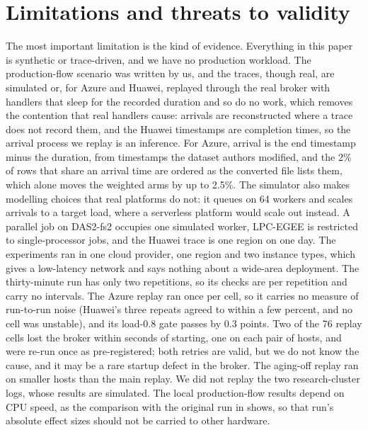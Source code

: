 \section{Limitations and threats to validity}\label{sec:limits}

The most important limitation is the kind of evidence. Everything in this paper is synthetic or trace-driven, and we
have no production workload. The production-flow scenario was written by us, and the traces, though real, are
simulated or, for Azure and Huawei, replayed through the real broker with handlers that sleep for the recorded duration and so do no work, which removes the contention that real handlers cause: arrivals are reconstructed where a trace does not record them, and the Huawei timestamps are completion times,
so the arrival process we replay is an inference. For Azure, arrival is the end timestamp minus the duration, from timestamps the dataset authors modified, and the 2\% of rows that share an arrival time are ordered as the converted file lists them, which alone moves the weighted arms by up to 2.5\%. The simulator also makes modelling choices that real platforms do not: it queues on 64 workers and scales arrivals to a target load, where a serverless platform would scale out instead. A parallel job on DAS2-fs2 occupies one simulated worker, LPC-EGEE is restricted to single-processor jobs, and the Huawei trace is one region on one day. The experiments ran in one cloud provider, one region and two instance types, which gives a low-latency network and says nothing about a wide-area deployment. The
thirty-minute run has only two repetitions, so its checks are per repetition and carry no intervals. The Azure replay ran once per cell, so it carries no measure of run-to-run noise (Huawei's three repeats agreed to within a few percent, and no cell was unstable), and its load-0.8 gate passes by 0.3 points. Two of the 76 replay cells lost the broker within seconds of starting, one on each pair of hosts, and were re-run once as pre-registered; both retries are valid, but we do not know the cause, and it may be a rare startup defect in the broker. The aging-off replay ran on smaller hosts than the main replay. We did not replay the two research-cluster logs, whose results are simulated. The local production-flow results depend on CPU speed, as the comparison with the original run in  shows, so that run's absolute effect sizes should not be carried to other hardware.

